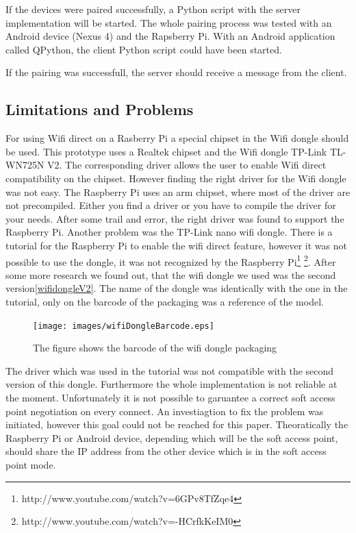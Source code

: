\noindent If the devices were paired successfully, a Python script with the server implementation will be started.
The whole pairing process was tested with an Android device (Nexus 4) and the Rapsberry Pi. With an Android application called QPython, the client Python script could have been started.

If the pairing was successfull, the server should receive a message from the client.

\subsection*{Limitations and Problems}
\label{subsec:RaspberryLimitationsProblems}
For using Wifi direct on a Rasberry Pi a special chipset in the Wifi dongle should be used. This prototype uses a Realtek chipset and the Wifi dongle TP-Link TL-WN725N V2. The corresponding driver allows the user to enable Wifi direct compatibility on the chipset. However finding the right driver for the Wifi dongle was not easy. The Raspberry Pi uses an arm chipset, where most of the driver are not precompiled. Either you find a driver or you have to compile the driver for your needs. After some trail and error, the right driver was found to support the Raspberry Pi. Another problem was the TP-Link nano wifi dongle. There is  a tutorial for the Raspberry Pi to enable the wifi direct feature, however it was not possible to use the dongle, it was not recognized by the Raspberry Pi\footnote{http://www.youtube.com/watch?v=6GPv8TfZqe4} \footnote{http://www.youtube.com/watch?v=-HCrfkKeIM0}. After some more research we found out, that the wifi dongle we used was the second version\ref{wifidongleV2}. The name of the dongle was identically with the one in the tutorial, only on the barcode of the packaging was a reference of the model.

\begin{figure}[!hb]
	\centering
  \texttt{[image: images/wifiDongleBarcode.eps]}
	\caption{The figure shows the barcode of the wifi dongle packaging}
	\label{fig1}
\end{figure}

\noindent The driver which was used in the tutorial was not compatible with the second version of this dongle. Furthermore the whole implementation is not reliable at the moment. Unfortunately it is not possible to garuantee a correct soft access point negotiation on every connect. An investiagtion to fix the problem was initiated, however this goal could not be reached for this paper. Theoratically the Raspberry Pi or Android device, depending which will be the soft access point, should share the IP address from the other device which is in the soft access point mode.


